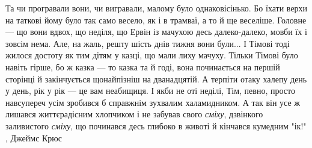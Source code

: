 Та чи програвали вони, чи вигравали, малому було однаковісінько. Бо їхати верхи
на таткові йому було так само весело, як і в трамваї, а то й ще веселіше.
Головне — що вони вдвох, що неділя, що Ервін із мачухою десь далеко-далеко,
мовби їх і зовсім нема.  Але, на жаль, решту шість днів тижня вони були... І
Тімові тоді жилося достоту як тим дітям у казці, що мали лиху мачуху. Тільки
Тімові було навіть гірше, бо ж казка — то казка та й годі, вона починається на
першій сторінці й закінчується щонайпізніш на дванадцятій. А терпіти отаку
халепу день у день, рік у рік — це вам неабищиця. І якби не оті неділі, Тім,
певно, просто навсупереч усім зробився б справжнім зухвалим халамидником. А так
він усе ж лишався життєрадісним хлопчиком і не забував свого \emph{сміху},
дзвінкого заливистого \emph{сміху}, що починався десь глибоко в животі й
кінчався кумедним "ік!"
, Джеймс Крюс
